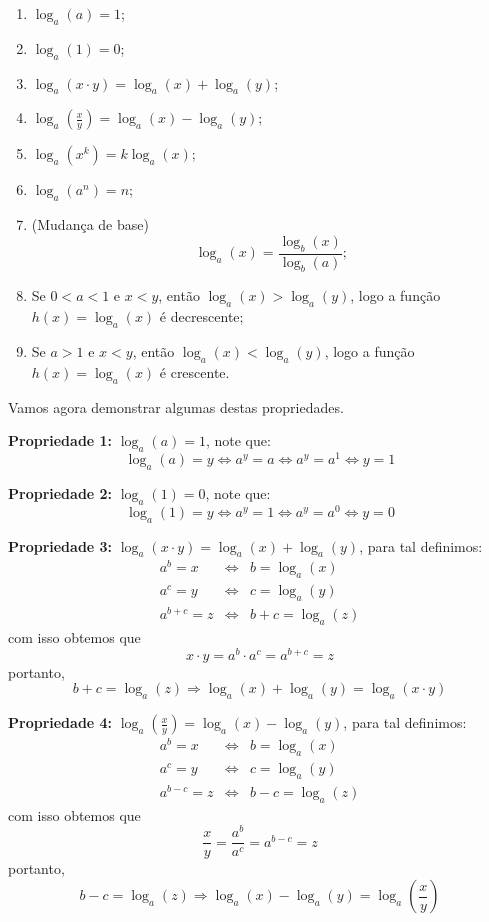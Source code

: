   \begin{enumerate}
  \item $\log_{a}(a)= 1$;
  \item $\log_{a}(1)= 0$;
   \item $\log_{a}(x \cdot y)=\log_{a}(x) + \log_{a}(y)$;
   \item $\log_{a} \left(\frac{x}{y}\right)=\log_{a}(x) - \log_{a}(y)$;
   \item $\log_{a}(x^{k})= k \log_{a}(x)$;
   \item $\log_{a}(a^n)= n$;
   \item (Mudança de base) \[\log_{a}(x)=\frac{\log_{b}(x)}{\log_{b}(a)};\]
   \item Se $0 < a < 1$ e $x < y$, então $\log_{a}(x) > \log_{a}(y)$, logo a função $h(x)= \log_{a}(x)$ é decrescente;
   \item Se $a> 1$ e $x < y$, então $\log_{a}(x) < \log_{a}(y)$, logo a função $h(x)= \log_{a}(x)$ é crescente.
  \end{enumerate}

  Vamos agora demonstrar algumas destas propriedades.

  \textbf{Propriedade 1:} $\log_{a}(a)= 1$, note que:
  \[\log_{a}(a)= y \Leftrightarrow a^y = a \Leftrightarrow a^y= a^1 \Leftrightarrow y=1\]
  \fim

  \textbf{Propriedade 2:} $\log_{a}(1)= 0$, note que:
  \[\log_{a}(1)= y \Leftrightarrow a^y= 1 \Leftrightarrow a^y= a^0 \Leftrightarrow y=0\]
  \fim

  \textbf{Propriedade 3:} $\log_{a}(x \cdot y)=\log_{a}(x) + \log_{a}(y)$, para tal definimos:
  \begin{eqnarray*}
   a^b= x & \Leftrightarrow & b= \log_{a}(x) \\
   a^c= y & \Leftrightarrow & c= \log_{a}(y) \\
   a^{b+c}= z & \Leftrightarrow & b+c= \log_{a}(z)
  \end{eqnarray*}
  com isso obtemos que
  \[x \cdot y= a^b \cdot a^c= a^{b+c}= z\]
  portanto,
  \[b+c= \log_{a}(z) \Rightarrow \log_{a}(x) + \log_{a}(y)= \log_{a}(x \cdot y)\]
  \fim

  \textbf{Propriedade 4:} $\log_{a} \left(\frac{x}{y}\right)=\log_{a}(x) - \log_{a}(y)$, para tal definimos:
  \begin{eqnarray*}
   a^b= x & \Leftrightarrow & b= \log_{a}(x) \\
   a^c= y & \Leftrightarrow & c= \log_{a}(y) \\
   a^{b-c}= z & \Leftrightarrow & b-c= \log_{a}(z)
  \end{eqnarray*}
  com isso obtemos que
  \[\dfrac{x}{y}= \dfrac{a^b}{a^c}= a^{b-c}= z\]
  portanto,
  \[b-c= \log_{a}(z) \Rightarrow \log_{a}(x) - \log_{a}(y)= \log_{a}\left(\frac{x}{y}\right)\]
  \fim

